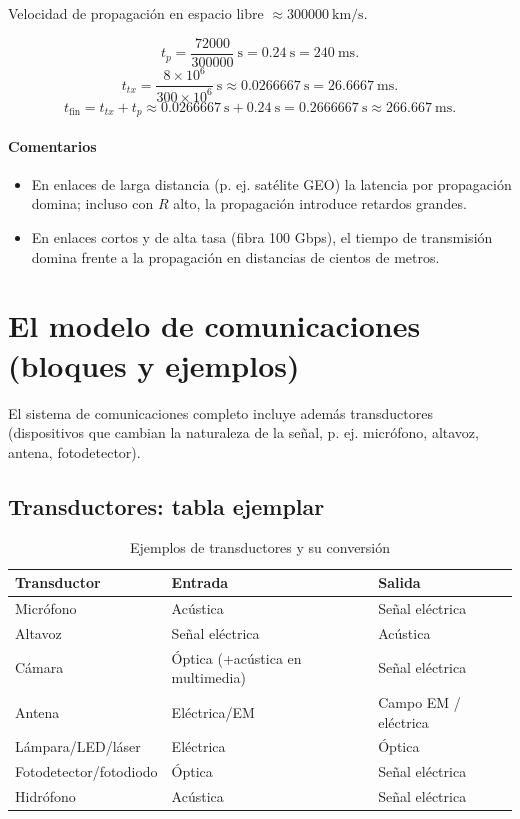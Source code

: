 \documentclass[11pt,a4paper]{article}
\newcommand{\s}{\mathrm{s}}
\begin{document}
Velocidad de propagación en espacio libre $\approx \SI{300000}{\kilo\meter\per\second}$.

\[
t_p = \frac{72000}{300000}\ \s = 0.24\ \s = 240\ \text{ms}.
\]
\[
t_{tx}=\frac{8\times 10^{6}}{300\times 10^{6}}\ \s \approx 0.0266667\ \s = 26.6667\ \text{ms}.
\]
\[
t_\text{fin}= t_{tx}+t_p \approx 0.0266667\ \s + 0.24\ \s = 0.2666667\ \s \approx 266.667\ \text{ms}.
\]

\paragraph{Comentarios}
\begin{itemize}
  \item En enlaces de larga distancia (p. ej. satélite GEO) la latencia por propagación domina; incluso con $R$ alto, la propagación introduce retardos grandes.
  \item En enlaces cortos y de alta tasa (fibra 100 Gbps), el tiempo de transmisión domina frente a la propagación en distancias de cientos de metros.
\end{itemize}

\section{El modelo de comunicaciones (bloques y ejemplos)}
El sistema de comunicaciones completo incluye además transductores (dispositivos que cambian la naturaleza de la señal, p. ej. micrófono, altavoz, antena, fotodetector).

\subsection{Transductores: tabla ejemplar}
\begin{table}[H]
  \centering
  \caption{Ejemplos de transductores y su conversión}
  \begin{tabular}{l l l}
    \toprule
    Transductor & Entrada & Salida \\
    \midrule
    Micrófono & Acústica & Señal eléctrica \\
    Altavoz & Señal eléctrica & Acústica \\
    Cámara & Óptica (+acústica en multimedia) & Señal eléctrica \\
    Antena & Eléctrica/EM & Campo EM / eléctrica \\
    Lámpara/LED/láser & Eléctrica & Óptica \\
    Fotodetector/fotodiodo & Óptica & Señal eléctrica \\
    Hidrófono & Acústica & Señal eléctrica \\
    \bottomrule
  \end{tabular}
\end{table}
\end{document}
